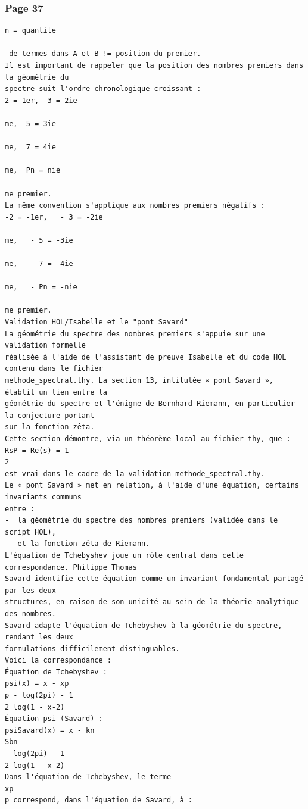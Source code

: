 \documentclass[11pt,a4paper]{article}
\begin{document}
\subsubsection*{Page 37}
\begin{Verbatim}[fontsize=\footnotesize]
n = quantite

 de termes dans A et B != position du premier. 
Il est important de rappeler que la position des nombres premiers dans la géométrie du 
spectre suit l'ordre chronologique croissant : 
2 = 1er,  3 = 2ie

me,  5 = 3ie

me,  7 = 4ie

me,  Pn = nie

me premier. 
La même convention s'applique aux nombres premiers négatifs : 
-2 = -1er,   - 3 = -2ie

me,   - 5 = -3ie

me,   - 7 = -4ie

me,   - Pn = -nie

me premier. 
Validation HOL/Isabelle et le "pont Savard" 
La géométrie du spectre des nombres premiers s'appuie sur une validation formelle 
réalisée à l'aide de l'assistant de preuve Isabelle et du code HOL contenu dans le fichier 
methode_spectral.thy. La section 13, intitulée « pont Savard », établit un lien entre la 
géométrie du spectre et l'énigme de Bernhard Riemann, en particulier la conjecture portant 
sur la fonction zêta. 
Cette section démontre, via un théorème local au fichier thy, que : 
RsP = Re(s) = 1
2 
est vrai dans le cadre de la validation methode_spectral.thy. 
Le « pont Savard » met en relation, à l'aide d'une équation, certains invariants communs 
entre : 
-  la géométrie du spectre des nombres premiers (validée dans le script HOL), 
-  et la fonction zêta de Riemann. 
L'équation de Tchebyshev joue un rôle central dans cette correspondance. Philippe Thomas 
Savard identifie cette équation comme un invariant fondamental partagé par les deux 
structures, en raison de son unicité au sein de la théorie analytique des nombres. 
Savard adapte l'équation de Tchebyshev à la géométrie du spectre, rendant les deux 
formulations difficilement distinguables. 
Voici la correspondance : 
Équation de Tchebyshev : 
psi(x) = x - xp
p - log(2pi) - 1
2 log(1 - x-2) 
Équation psi (Savard) : 
psiSavard(x) = x - kn
Sbn
- log(2pi) - 1
2 log(1 - x-2) 
Dans l'équation de Tchebyshev, le terme 
xp
p correspond, dans l'équation de Savard, à : 
\end{Verbatim}
\medskip
\end{document}
